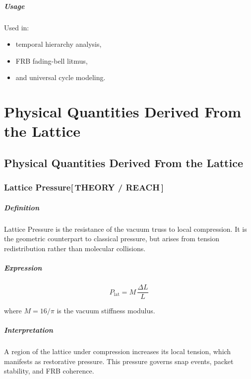 \documentclass[12pt,oneside]{book}
\newcommand{\TheoryTag}{\;\colorbox{theorytag!15}{\textcolor{theorytag}{\footnotesize\bfseries [\,THEORY / REACH\,]}}}
\begin{document}
\subsubsection{Usage}
Used in:
\begin{itemize}
    \item temporal hierarchy analysis,
    \item FRB fading-bell litmus,
    \item and universal cycle modeling.
\end{itemize}

\part{Physical Quantities Derived From the Lattice}
\chapter{Physical Quantities Derived From the Lattice}

\section{Lattice Pressure\TheoryTag}

\subsubsection{Definition}
Lattice Pressure is the resistance of the vacuum truss to local compression. It is the geometric
counterpart to classical pressure, but arises from tension redistribution rather than molecular
collisions.

\subsubsection{Expression}


\[
P_{\mathrm{lat}} = M \, \frac{\Delta L}{L}
\]


where $M = 16/\pi$ is the vacuum stiffness modulus.

\subsubsection{Interpretation}
A region of the lattice under compression increases its local tension, which manifests as
restorative pressure. This pressure governs snap events, packet stability, and FRB coherence.
\end{document}
